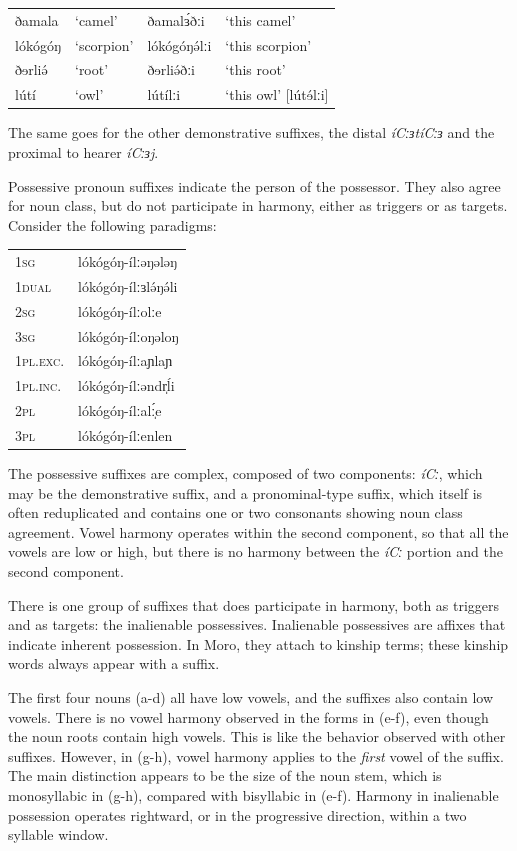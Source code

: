 \ea
\begin{tabular}[t]{llll}
ðamala	&	‘camel’		&	ðamalɜ́ðːi	&	‘this camel’\\
lókógóŋ	&	‘scorpion’	&	lókógóŋə́lːi	&	‘this scorpion’\\
ðɘrliə́	&	‘root’		&	ðɘrliə́ðːi	&	‘this root’\\
lútí	&	‘owl’		&	lútílːi		&	‘this owl’	[lútɘ́lːi]\\
\end{tabular}
\z

The same goes for the other demonstrative suffixes, the distal \textit{íCːɜtíCːɜ} and the proximal to hearer \textit{íCːɜj}. 

Possessive pronoun suffixes indicate the person of the possessor. They also agree for noun class, but do not participate in harmony, either as triggers or as targets. Consider the following paradigms:

\ea
\begin{tabular}[t]{ll}
	1\textsc{sg}		&	lókógóŋ-ílːəŋələŋ \\
	1\textsc{dual}	&	lókógóŋ-ílːɜlə́ŋə́li  \\
	2\textsc{sg}		&	lókógóŋ-ílːolːe \\
	3\textsc{sg}		&	lókógóŋ-ílːoŋəloŋ\\
	1\textsc{pl.exc}.&	lókógóŋ-ílːaɲlaɲ  \\
	1\textsc{pl.inc}.&	lókógóŋ-ílːəndr̩ĺi \\ 
	2\textsc{pl}		&	lókógóŋ-ílːalː̩́e \\
	3\textsc{pl}		&	lókógóŋ-ílːenlen\\
\end{tabular}
\z

The possessive suffixes are complex, composed of two components: \textit{íCː}, which may be the demonstrative suffix, and a pronominal-type suffix, which itself is often reduplicated and contains one or two consonants showing noun class agreement. Vowel harmony operates within the second component, so that all the vowels are low or high, but there is no harmony between the \textit{íCː} portion and the second component.

There is one group of suffixes that does participate in harmony, both as triggers and as targets: the inalienable possessives. Inalienable possessives are affixes that indicate inherent possession. In Moro, they attach to kinship terms; these kinship words always appear with a suffix. 

The first four nouns (a-d) all have low vowels, and the suffixes also contain low vowels. There is no vowel harmony observed in the forms in (e-f), even though the noun roots contain high vowels. This is like the behavior observed with other suffixes. However, in (g-h), vowel harmony applies to the \textit{first} vowel of the suffix. The main distinction appears to be the size of the noun stem, which is monosyllabic in (g-h), compared with bisyllabic in (e-f). Harmony in inalienable possession operates rightward, or in the progressive direction, within a two syllable window. 

